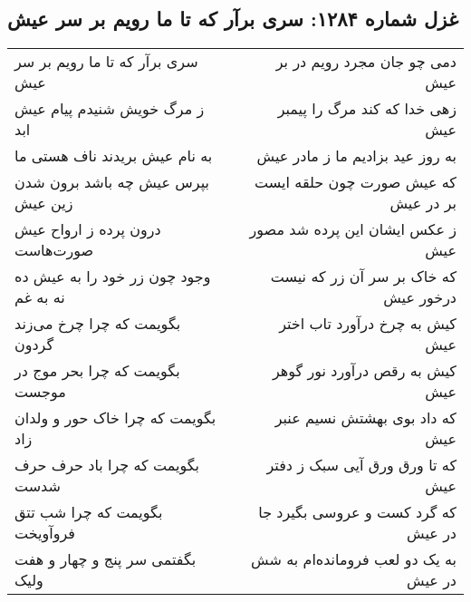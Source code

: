 \begin{center}
\section*{غزل شماره ۱۲۸۴: سری برآر که تا ما رویم بر سر عیش}
\label{sec:1284}
\begin{longtable}{l p{0.5cm} r}
سری برآر که تا ما رویم بر سر عیش
&&
دمی چو جان مجرد رویم در بر عیش
\\
ز مرگ خویش شنیدم پیام عیش ابد
&&
زهی خدا که کند مرگ را پیمبر عیش
\\
به نام عیش بریدند ناف هستی ما
&&
به روز عید بزادیم ما ز مادر عیش
\\
بپرس عیش چه باشد برون شدن زین عیش
&&
که عیش صورت چون حلقه ایست بر در عیش
\\
درون پرده ز ارواح عیش صورت‌هاست
&&
ز عکس ایشان این پرده شد مصور عیش
\\
وجود چون زر خود را به عیش ده نه به غم
&&
که خاک بر سر آن زر که نیست درخور عیش
\\
بگویمت که چرا چرخ می‌زند گردون
&&
کیش به چرخ درآورد تاب اختر عیش
\\
بگویمت که چرا بحر موج در موجست
&&
کیش به رقص درآورد نور گوهر عیش
\\
بگویمت که چرا خاک حور و ولدان زاد
&&
که داد بوی بهشتش نسیم عنبر عیش
\\
بگویمت که چرا باد حرف حرف شدست
&&
که تا ورق ورق آیی سبک ز دفتر عیش
\\
بگویمت که چرا شب تتق فروآویخت
&&
که گرد کست و عروسی بگیرد جا در عیش
\\
بگفتمی سر پنج و چهار و هفت ولیک
&&
به یک دو لعب فرومانده‌ام به شش در عیش
\\
\end{longtable}
\end{center}
